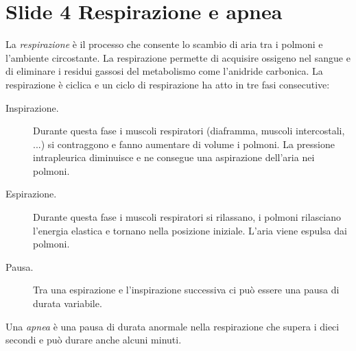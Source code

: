 \section{Slide 4 Respirazione e apnea}

La \emph{respirazione} \`e il processo che consente lo scambio di aria tra i polmoni e l'ambiente circostante. 
La respirazione permette di acquisire ossigeno nel sangue e di eliminare i residui gassosi del metabolismo come l'anidride carbonica. 
La respirazione \`e ciclica e un ciclo di respirazione ha atto in tre fasi consecutive:
\begin{description}
  \item[Inspirazione.]
    Durante questa fase i muscoli respiratori (diaframma, muscoli intercostali, ...) si contraggono e fanno aumentare di volume i polmoni.
    La pressione intrapleurica diminuisce e ne consegue una aspirazione dell'aria nei polmoni.
  \item[Espirazione.]
    Durante questa fase i muscoli respiratori si rilassano, i polmoni rilasciano l'energia elastica e tornano nella posizione iniziale.
    L'aria viene espulsa dai polmoni. 
    \item[Pausa.]
    Tra una espirazione e l'inspirazione successiva ci pu\`o essere una pausa di durata variabile. 
\end{description}

Una \emph{apnea} \`e una pausa di durata anormale nella respirazione che supera i dieci secondi  e pu\`o durare anche alcuni minuti. 
